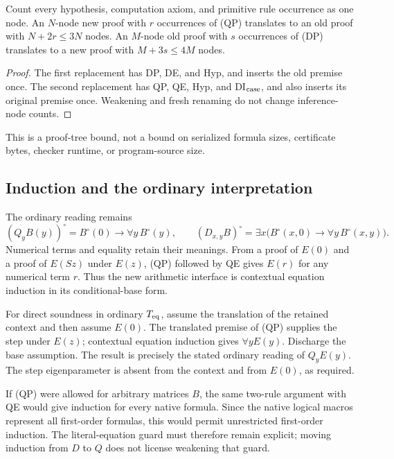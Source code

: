 \begin{proposition}
Count every hypothesis, computation axiom, and primitive rule occurrence
as one node.  An $N$-node new proof with $r$ occurrences of (QP) translates
to an old proof with $N+2r\leq3N$ nodes.  An $M$-node old proof with $s$
occurrences of (DP) translates to a new proof with $M+3s\leq4M$ nodes.
\end{proposition}
\begin{proof}
The first replacement has DP, DE, and Hyp, and inserts the old premise
once.  The second replacement has QP, QE, Hyp, and DI$_{\rm case}$, and
also inserts its original premise once.  Weakening and fresh renaming
do not change inference-node counts.
\end{proof}
This is a proof-tree bound, not a bound on serialized formula sizes,
certificate bytes, checker runtime, or program-source size.

\subsection{Induction and the ordinary interpretation}

The ordinary reading remains
\[
 (Q_yB(y))^\circ=B^\circ(0)\to\forall y\,B^\circ(y),
 \qquad
 (D_{x,y}B)^\circ=
     \exists x\bigl(B^\circ(x,0)\to\forall y\,B^\circ(x,y)\bigr).
\]
Numerical terms and equality retain their meanings.  From a proof of
$E(0)$ and a proof of $E(Sz)$ under $E(z)$, (QP) followed by QE gives
$E(r)$ for any numerical term $r$.  Thus the new arithmetic interface
is contextual equation induction in its conditional-base form.

For direct soundness in ordinary $T_{\rm eq}$, assume the translation of
the retained context and then assume $E(0)$.  The translated premise
of (QP) supplies the step under $E(z)$; contextual equation induction
gives $\forall y E(y)$.  Discharge the base assumption.  The result is
precisely the stated ordinary reading of $Q_yE(y)$.  The step
eigenparameter is absent from the context and from $E(0)$, as required.

If (QP) were allowed for arbitrary matrices $B$, the same two-rule
argument with QE would give induction for every native formula.  Since
the native logical macros represent all first-order formulas, this would
permit unrestricted first-order induction.  The literal-equation guard
must therefore remain explicit; moving induction from $D$ to $Q$ does
not license weakening that guard.

